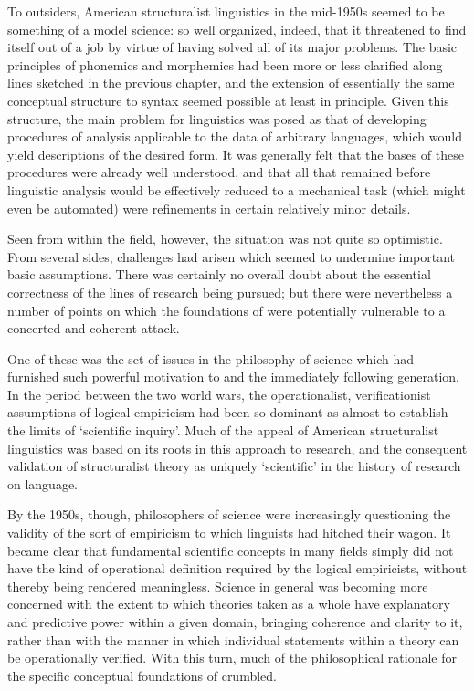To outsiders, American structuralist linguistics in the mid-1950s
seemed to be something of a model science: so well organized, indeed,
that it threatened to find itself out of a job by virtue of having
solved all of its major problems. The basic principles of phonemics
and morphemics had been more or less clarified along lines sketched in
the previous chapter, and the extension of essentially the same
conceptual structure to syntax seemed possible at least in
principle. Given this structure, the main problem for linguistics was
posed as that of developing procedures of analysis applicable to the
data of arbitrary languages, which would yield descriptions of the
desired form. It was generally felt that the bases of these procedures
were already well understood, and that all that remained before
linguistic analysis would be effectively reduced to a mechanical task
(which might even be automated) were refinements in certain relatively
minor details.

Seen from within the field, however, the situation was not quite so
optimistic. From several sides, challenges had arisen which seemed to
undermine important basic assumptions. There was certainly no overall
doubt about the essential correctness of the lines of research being
pursued; but there were nevertheless a number of points on which the
foundations of  were potentially vulnerable to a
concerted and coherent attack.

One of these was the set of issues in the philosophy of science which
had furnished such powerful motivation to {\Bloomfield} and the
immediately following generation. In the period between the two world
wars, the operationalist, verificationist assumptions of logical
empiricism had been so dominant as almost to establish the limits of
`scientific inquiry'. Much of the appeal of American structuralist
linguistics was based on its roots in this approach to research, and
the consequent validation of structuralist theory as uniquely
`scientific' in the history of research on language.

By the 1950s, though, philosophers of science were increasingly
questioning the validity of the sort of empiricism to which linguists
had hitched their wagon. It became clear that fundamental scientific
concepts in many fields simply did not have the kind of operational
definition required by the logical empiricists, without thereby being
rendered meaningless. Science in general was becoming more concerned
with the extent to which theories taken as a whole have explanatory
and predictive power within a given domain, bringing coherence and
clarity to it, rather than with the manner in which individual
statements within a theory can be operationally verified. With this
turn, much of the philosophical rationale for the specific conceptual
foundations of  crumbled.

